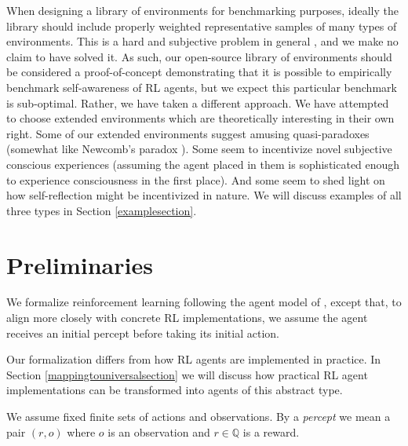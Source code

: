 \documentclass{article}
\begin{document}
When designing a library of environments for benchmarking purposes, ideally the
library should include properly weighted representative samples of many types of
environments. This is a hard and subjective problem in general
\cite{leike2015bad}, and we make no claim to have solved
it. As such, our open-source library of environments should be considered a proof-of-concept
demonstrating that it is possible to empirically benchmark self-awareness of RL
agents, but we expect this particular benchmark is sub-optimal.
Rather, we have taken a different approach.
We have attempted to choose extended environments which are theoretically
interesting in their own right. Some of our extended environments
suggest amusing quasi-paradoxes (somewhat like Newcomb's paradox
\cite{nozick1969newcomb}). Some seem to incentivize novel subjective conscious
experiences (assuming the agent placed in them is sophisticated enough to experience
consciousness in the first place). And some seem to shed light on how self-reflection
might be incentivized in nature. We will discuss examples of all three types in
Section \ref{examplesection}.

\section{Preliminaries}

We formalize reinforcement learning following
the agent model of \cite{hutter2004universal},
except that,
to align more closely with concrete RL implementations,
we assume the agent receives an initial percept before
taking its initial action.

Our formalization differs from how RL agents are
implemented in practice. In Section \ref{mappingtouniversalsection}
we will discuss how practical RL agent implementations can be
transformed into agents of this abstract type.

We assume fixed finite sets of actions and observations. By a \emph{percept}
we mean a pair $(r,o)$ where $o$ is an observation and $r\in\mathbb Q$
is a reward.
\end{document}
